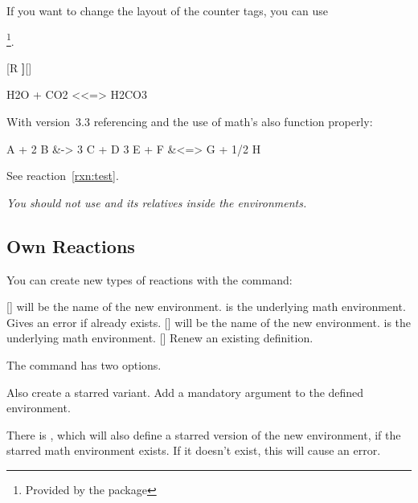 \documentclass[load-preamble+]{cnltx-doc}
\renewcommand*\AmS{\hologo{AmS}}
\begin{document}
If you want to change the layout of the counter tags, you can use

\footnote{Provided by the  package}.

\begin{example}
  [R \textbf]{[}{]}
  \begin{reaction}
    H2O + CO2 <<=> H2CO3
  \end{reaction}
\end{example}

With version~3.3 referencing and the use of \AmS math's  also
function properly:
\begin{example}
  \begin{reactions}
    A + 2 B &-> 3 C + D \label{rxn:test}
    3 E + F &<=> G + 1/2 H
  \end{reactions}
  See reaction~\ref{rxn:test}.
\end{example}

\emph{You should not use  and its relatives inside the 
  environments.}

\subsection{Own Reactions}
You can create new types of reactions with the command:
\begin{commands}
  []
     will be the name of the new environment.
     is the underlying math environment.  Gives an error if
     already exists.
  []
     will be the name of the new environment.
     is the underlying math environment.
  []
    Renew an existing definition.
\end{commands}

The command has two options.
\begin{options}
    Also create a starred variant.
    Add a mandatory argument to the defined environment.
\end{options}
There is , which will also define a starred version of the new
environment, if the starred math environment exists.  If it doesn't exist,
this will cause an error.
\end{document}
